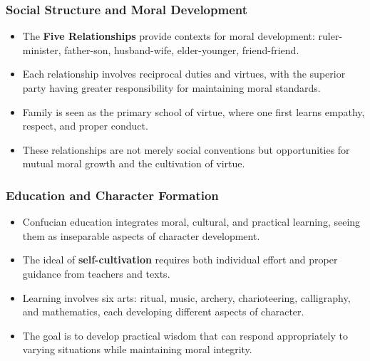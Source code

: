 \documentclass{beamer}
\begin{document}
\begin{frame}
    \frametitle{Social Structure and Moral Development}
    \begin{itemize}
        \item The \textbf{Five Relationships} provide contexts for moral development: ruler-minister, father-son, husband-wife, elder-younger, friend-friend.
        
        \item Each relationship involves reciprocal duties and virtues, with the superior party having greater responsibility for maintaining moral standards.
        
        \item Family is seen as the primary school of virtue, where one first learns empathy, respect, and proper conduct.
        
        \item These relationships are not merely social conventions but opportunities for mutual moral growth and the cultivation of virtue.
    \end{itemize}
\end{frame}

\begin{frame}
    \frametitle{Education and Character Formation}
    \begin{itemize}
        \item Confucian education integrates moral, cultural, and practical learning, seeing them as inseparable aspects of character development.
        
        \item The ideal of \textbf{self-cultivation} requires both individual effort and proper guidance from teachers and texts.
        
        \item Learning involves six arts: ritual, music, archery, charioteering, calligraphy, and mathematics, each developing different aspects of character.
        
        \item The goal is to develop practical wisdom that can respond appropriately to varying situations while maintaining moral integrity.
    \end{itemize}
\end{frame}
\end{document}
